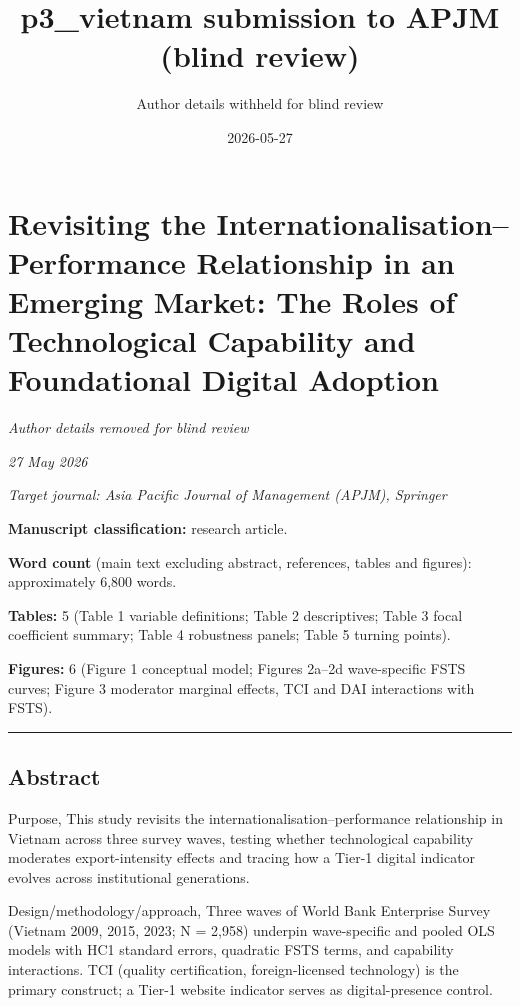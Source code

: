 \documentclass[12pt,a4paper]{article}
\title{p3\_vietnam submission to APJM (blind review)}
\author{Author details withheld for blind review}
\date{2026-05-27}
\begin{document}
\maketitle

\hypertarget{revisiting-the-internationalisationperformance-relationship-in-an-emerging-market-the-roles-of-technological-capability-and-foundational-digital-adoption}{%
\section{Revisiting the Internationalisation--Performance Relationship
in an Emerging Market: The Roles of Technological Capability and
Foundational Digital
Adoption}\label{revisiting-the-internationalisationperformance-relationship-in-an-emerging-market-the-roles-of-technological-capability-and-foundational-digital-adoption}}

\emph{Author details removed for blind review}

\emph{27 May 2026}

\emph{Target journal: Asia Pacific Journal of Management (APJM),
Springer}

\textbf{Manuscript classification:} research article.

\textbf{Word count} (main text excluding abstract, references, tables
and figures): approximately 6,800 words.

\textbf{Tables:} 5 (Table 1 variable definitions; Table 2 descriptives;
Table 3 focal coefficient summary; Table 4 robustness panels; Table 5
turning points).

\textbf{Figures:} 6 (Figure 1 conceptual model; Figures 2a--2d
wave-specific FSTS curves; Figure 3 moderator marginal effects, TCI and
DAI interactions with FSTS).

\begin{center}\rule{0.5\linewidth}{0.5pt}\end{center}

\hypertarget{abstract}{%
\subsection{Abstract}\label{abstract}}

Purpose, This study revisits the internationalisation--performance
relationship in Vietnam across three survey waves, testing whether
technological capability moderates export-intensity effects and tracing
how a Tier-1 digital indicator evolves across institutional generations.

Design/methodology/approach, Three waves of World Bank Enterprise Survey
(Vietnam 2009, 2015, 2023; N = 2,958) underpin wave-specific and pooled
OLS models with HC1 standard errors, quadratic FSTS terms, and
capability interactions. TCI (quality certification, foreign-licensed
technology) is the primary construct; a Tier-1 website indicator serves
as digital-presence control.
\end{document}
